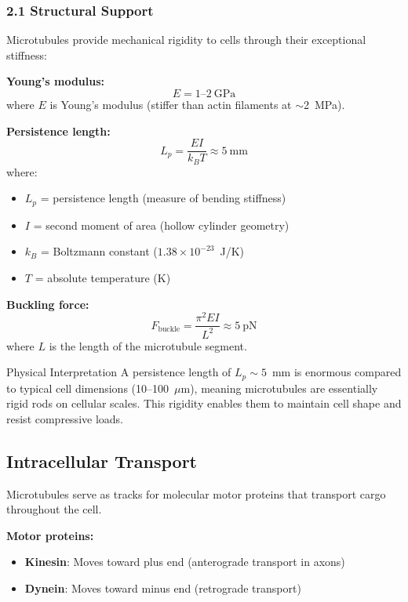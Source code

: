 \subsubsection{2.1 Structural Support}\label{structural-support}

Microtubules provide mechanical rigidity to cells through their exceptional stiffness:

\textbf{Young's modulus:}
\begin{equation}
E = 1\text{--}2\ \mathrm{GPa}
\end{equation}
where $E$ is Young's modulus (stiffer than actin filaments at $\sim$2~MPa).

\textbf{Persistence length:}
\begin{equation}
L_p = \frac{EI}{k_B T} \approx 5\ \mathrm{mm}
\end{equation}
where:
\begin{itemize}
\item $L_p$ = persistence length (measure of bending stiffness)
\item $I$ = second moment of area (hollow cylinder geometry)
\item $k_B$ = Boltzmann constant ($1.38 \times 10^{-23}$~J/K)
\item $T$ = absolute temperature (K)
\end{itemize}

\textbf{Buckling force:}
\begin{equation}
F_{\mathrm{buckle}} = \frac{\pi^2 EI}{L^2} \approx 5\ \mathrm{pN}
\end{equation}
where $L$ is the length of the microtubule segment.

\begin{calloutbox}{Physical Interpretation}
A persistence length of $L_p \sim 5$~mm is enormous compared to typical cell dimensions (10--100~$\mu$m), meaning microtubules are essentially rigid rods on cellular scales. This rigidity enables them to maintain cell shape and resist compressive loads.
\end{calloutbox}

\subsection{Intracellular Transport}

Microtubules serve as tracks for molecular motor proteins that transport cargo throughout the cell.

\textbf{Motor proteins:}
\begin{itemize}
\item \textbf{Kinesin}: Moves toward plus end (anterograde transport in axons)
\item \textbf{Dynein}: Moves toward minus end (retrograde transport)
\end{itemize}

